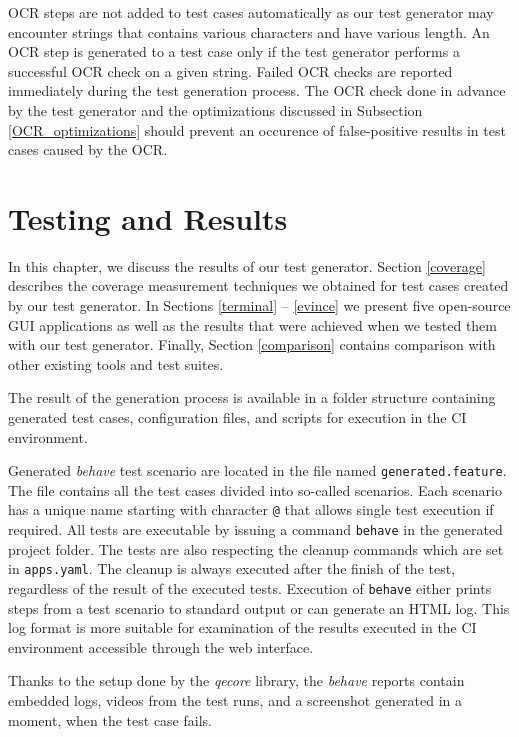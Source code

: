 OCR steps are not added to test cases automatically as our test generator may encounter strings that contains various characters and have various length. An OCR step is generated to a test case only if the test generator performs a successful OCR check on a given string. Failed OCR checks are reported immediately during the test generation process. The OCR check done in advance by the test generator and the optimizations discussed in Subsection \ref{OCR_optimizations} should prevent an occurence of false-positive results in test cases caused by the OCR. 



\chapter{Testing and Results}
In this chapter, we discuss the results of our test generator. Section \ref{coverage} describes the coverage measurement techniques we obtained for test cases created by our test generator.  In Sections \ref{terminal} -- \ref{evince} we present five open-source GUI applications as well as the results that were achieved when we tested them with our test generator. Finally, Section \ref{comparison} contains comparison with other existing tools and test suites.

The result of the generation process is available in a folder structure containing generated test cases, configuration files, and scripts for execution in the CI environment. 

Generated \textit{behave} test scenario are located in the file named \texttt{generated.feature}. The file contains all the test cases divided into so-called scenarios. Each scenario has a unique name starting with character \texttt{@} that allows single test execution if required. All tests are executable by issuing a command \texttt{behave} in the generated project folder. The tests are also respecting the cleanup commands which are set in \texttt{apps.yaml}. The cleanup is always executed after the finish of the test, regardless of the result of the executed tests. Execution of \texttt{behave} either prints steps from a test scenario to standard output or can generate an HTML log. This log format is more suitable for examination of the results executed in the CI environment accessible through the web interface. 

Thanks to the setup done by the \textit{qecore} library, the \textit{behave} reports contain embedded logs, videos from the test runs, and a screenshot generated in a moment, when the test case fails.

